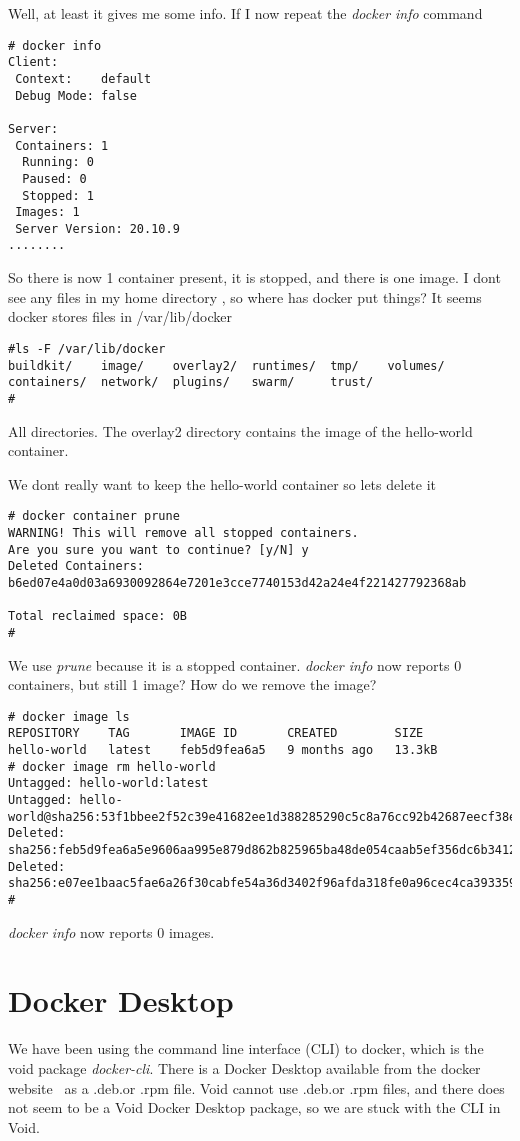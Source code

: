\documentclass{article}  %
\begin{document}
Well, at least it gives me some info. If I now repeat the {\em docker info} command
\begin{verbatim}
# docker info
Client:
 Context:    default
 Debug Mode: false

Server:
 Containers: 1
  Running: 0
  Paused: 0
  Stopped: 1
 Images: 1
 Server Version: 20.10.9
........
\end{verbatim}
So there is now 1 container present, it is stopped, and there is one image.
I dont see any files in my home directory , so where has docker put things? It  seems docker stores files in /var/lib/docker
\begin{verbatim}
#ls -F /var/lib/docker
buildkit/    image/    overlay2/  runtimes/  tmp/    volumes/
containers/  network/  plugins/   swarm/     trust/
# 
\end{verbatim}
All directories. The overlay2  directory contains the image of the hello-world container.

 We dont really want to keep the hello-world container so lets delete it
\begin{verbatim}
# docker container prune
WARNING! This will remove all stopped containers.
Are you sure you want to continue? [y/N] y
Deleted Containers:
b6ed07e4a0d03a6930092864e7201e3cce7740153d42a24e4f221427792368ab

Total reclaimed space: 0B
# 
\end{verbatim}
We use {\em prune} because it is a stopped container. {\em docker info} now reports 0 containers, but still 1 image? How do we remove the image?
\begin{verbatim}
# docker image ls
REPOSITORY    TAG       IMAGE ID       CREATED        SIZE
hello-world   latest    feb5d9fea6a5   9 months ago   13.3kB
# docker image rm hello-world
Untagged: hello-world:latest
Untagged: hello-world@sha256:53f1bbee2f52c39e41682ee1d388285290c5c8a76cc92b42687eecf38e0af3f0
Deleted: sha256:feb5d9fea6a5e9606aa995e879d862b825965ba48de054caab5ef356dc6b3412
Deleted: sha256:e07ee1baac5fae6a26f30cabfe54a36d3402f96afda318fe0a96cec4ca393359
# 
\end{verbatim}
{\em docker info} now reports 0 images. 

\section{Docker Desktop}
We have been using the command line interface (CLI) to docker, which is the void package {\em docker-cli}. There is a Docker Desktop available from the docker website~\cite{dock:01} as a .deb.or .rpm file.  Void cannot use .deb.or .rpm files, and there does not seem to be a Void Docker Desktop package, so we are stuck with the CLI in Void.
\end{document}
